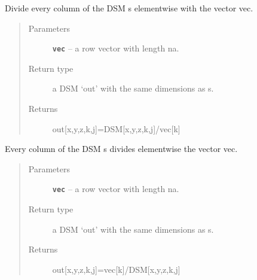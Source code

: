 \documentclass[letterpaper,10pt,english]{sphinxmanual}
\begin{document}
\begin{fulllineitems}
\begin{fulllineitems}
\begin{quote}
\begin{description}
\end{description}\end{quote}

\end{fulllineitems}


\begin{fulllineitems}
\label{index:DictionarySparseMatrix.DS.dict_DSM_divideby_vec}
Divide every column of the DSM s elementwise with the vector vec.
\begin{quote}\begin{description}
\item[{Parameters}] \leavevmode
\textbf{\texttt{vec}} -- a row vector with length na.

\item[{Return type}] \leavevmode
a DSM `out' with the same dimensions as s.

\item[{Returns}] \leavevmode
out{[}x,y,z,k,j{]}=DSM{[}x,y,z,k,j{]}/vec{[}k{]}

\end{description}\end{quote}

\end{fulllineitems}


\begin{fulllineitems}
\label{index:DictionarySparseMatrix.DS.dict_vec_divideby_DSM}
Every column of the DSM s divides elementwise the vector vec.
\begin{quote}\begin{description}
\item[{Parameters}] \leavevmode
\textbf{\texttt{vec}} -- a row vector with length na.

\item[{Return type}] \leavevmode
a DSM `out' with the same dimensions as s.

\item[{Returns}] \leavevmode
out{[}x,y,z,k,j{]}=vec{[}k{]}/DSM{[}x,y,z,k,j{]}

\end{description}\end{quote}


\end{fulllineitems}
\end{fulllineitems}
\end{document}
